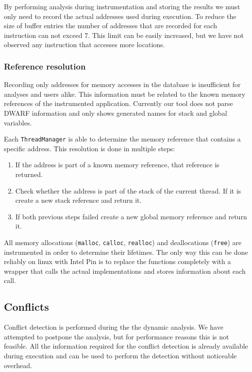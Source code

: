 By performing analysis during instrumentation and storing the results we must only need to record the actual addresses used during execution. To reduce the size of buffer entries the number of addresses that are recorded for each instruction can not exceed 7. This limit can be easily increased, but we have not observed any instruction that accesses more locations. 

\subsubsection{Reference resolution}

Recording only addresses for memory accesses in the database is insufficient for analyses and users alike. This information must be related to the known memory references of the instrumented application. Currently our tool does not parse DWARF information and only shows generated names for stack and global variables.

Each \texttt{ThreadManager} is able to determine the memory reference that contains a specific address. This resolution is done in multiple steps:

\begin{enumerate}
	\item If the address is part of a known memory reference, that reference is returned.
	\item Check whether the address is part of the stack of the current thread. If it is create a new stack reference and return it.
	\item If both previous steps failed create a new global memory reference and return it.
\end{enumerate}

All memory allocations (\texttt{malloc}, \texttt{calloc}, \texttt{realloc}) and deallocations (\texttt{free}) are instrumented in order to determine their lifetimes. The only way this can be done reliably on linux with Intel Pin is to replace the functions completely with a wrapper that calls the actual implementations and stores information about each call.

\subsection{Conflicts}

Conflict detection is performed during the the dynamic analysis. We have attempted to postpone the analysis, but for performance reasons this is not feasible. All the information required for the conflict detection is already available during execution and can be used to perform the detection without noticeable overhead.

